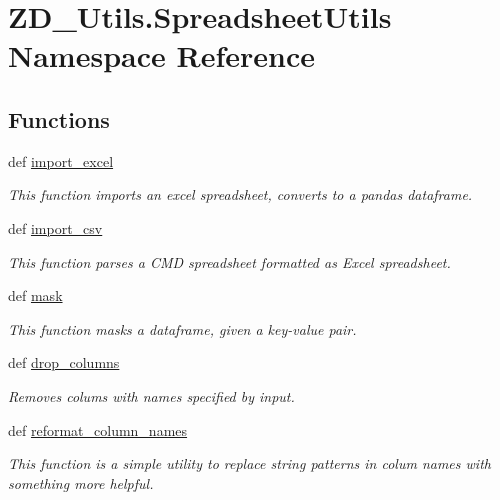 \hypertarget{namespace_z_d___utils_1_1_spreadsheet_utils}{\section{Z\-D\-\_\-\-Utils.\-Spreadsheet\-Utils Namespace Reference}
\label{namespace_z_d___utils_1_1_spreadsheet_utils}
}
\subsection*{Functions}
\begin{DoxyCompactItemize}
\item 
def \hyperlink{namespace_z_d___utils_1_1_spreadsheet_utils_a5ae53a4ce51fc5bd17ce4c63f0b40451}{import\-\_\-excel}
\begin{DoxyCompactList}\small\item\em This function imports an excel spreadsheet, converts to a pandas dataframe. \end{DoxyCompactList}\item 
def \hyperlink{namespace_z_d___utils_1_1_spreadsheet_utils_a4fdba56179861d6f42962ea9999c5c81}{import\-\_\-csv}
\begin{DoxyCompactList}\small\item\em This function parses a C\-M\-D spreadsheet formatted as Excel spreadsheet. \end{DoxyCompactList}\item 
def \hyperlink{namespace_z_d___utils_1_1_spreadsheet_utils_ab4c3765269b004f495a03152460ce8e3}{mask}
\begin{DoxyCompactList}\small\item\em This function masks a dataframe, given a key-\/value pair. \end{DoxyCompactList}\item 
def \hyperlink{namespace_z_d___utils_1_1_spreadsheet_utils_a9cf62cf70191a5772a6b9c392906f7d6}{drop\-\_\-columns}
\begin{DoxyCompactList}\small\item\em Removes colums with names specified by input. \end{DoxyCompactList}\item 
def \hyperlink{namespace_z_d___utils_1_1_spreadsheet_utils_ae123e9775102035a4036b15c45883130}{reformat\-\_\-column\-\_\-names}
\begin{DoxyCompactList}\small\item\em This function is a simple utility to replace string patterns in colum names with something more helpful. \end{DoxyCompactList}\end{DoxyCompactItemize}


